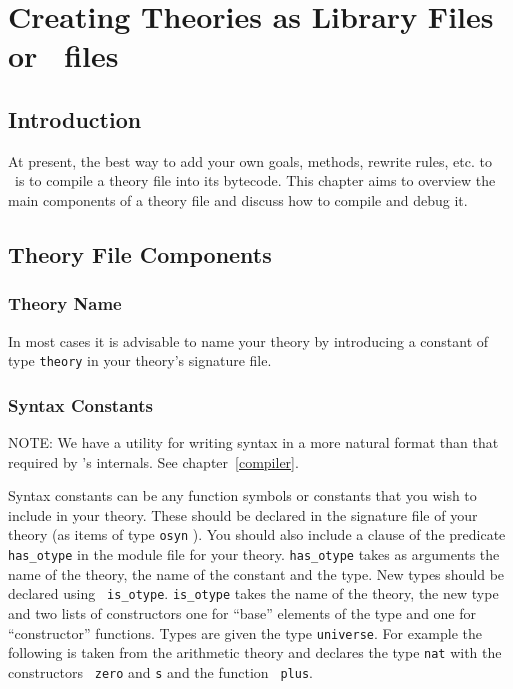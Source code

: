 \chapter{Creating Theories as Library Files or
\lprolog\ files}
\label{mktheory}

\section{Introduction}
At present, the best way to add your own goals,
methods, rewrite rules, etc. to
\lclam\ is to compile a theory file into its bytecode.  This chapter
aims to overview the main components of a theory file and discuss how
to compile and debug it.

\section{Theory File Components}
\subsection{Theory Name}
In most cases it is advisable to name your theory by introducing a
constant of type {\tt theory} in your theory's
signature file.  

\subsection{Syntax Constants}
NOTE:  We have a utility for writing syntax in a more natural format
than that required by \lclam's internals.  See chapter~\ref{compiler}.

Syntax constants can be any function symbols or constants that you
wish to include in your theory.  These should be declared in the
signature file of your theory (as items of type {\tt osyn} ).  You should also include a clause of the predicate {\tt
  has\_otype} in the module file for your theory.
{\tt has\_otype} takes as arguments the name of the theory, the name
of the constant and the type.  New types should be declared using {\tt
  is\_otype}.  {\tt is\_otype} takes the name of the
theory, the new type and two lists of constructors one for ``base''
elements of the type and one for ``constructor'' functions.  Types are
given the type {\tt universe}.  For example the
following is taken from the arithmetic theory
and declares the type {\tt nat} with the constructors {\tt
  zero} and {\tt s} and the function {\tt
  plus}.

